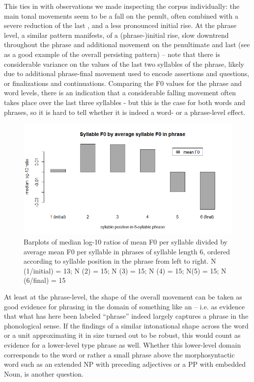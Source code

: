 \documentclass[output=paper]{LSP/langsci}
\begin{document}
This ties in with observations we made inspecting the corpus individually: the main tonal movements seem to be a fall on the penult, often combined with a severe reduction of the last , and a less pronounced initial rise. At the phrase level, a similar pattern manifests, of a (phrase-)initial rise, slow downtrend throughout the phrase and additional movement on the penultimate and last  (see   as a good example of the overall persisting pattern) – note that there is considerable variance on the values of the last two syllables of the phrase, likely due to additional phrase-final movement used to encode assertions and questions, or finalizations and continuations. Comparing the F0 values for the phrase and word levels, there is an indication that a considerable falling movement often takes place over the last three syllables - but this is the case for both words and phrases, so it is hard to tell whether it is indeed a word- or a phrase-level effect.

\begin{figure}
\includegraphics[width=\textwidth]{figures/BUC-img5_new.png}
\caption{Barplots of median log-10 ratios of mean F0 per syllable divided by average mean F0 per syllable in phrases of syllable length 6, ordered according to syllable position in the phrase from left to right. N (1/initial) = 13; N (2) = 15; N (3) = 15; N (4) = 15; N(5) = 15; N (6/final) = 15}
\label{fig:buc:5}
\end{figure}

At least at the phrase-level, the shape of the overall movement can be taken as good evidence for phrasing in the domain of something like an  – i.e. as evidence that what has here been labeled “phrase” indeed largely captures a phrase in the phonological sense. If the findings of a similar intonational shape across the word or a unit approximating it in size turned out to be robust, this would count as evidence for a lower-level type phrase as well. Whether this lower-level domain corresponds to the word or rather a small phrase above the morphosyntactic word such as an extended NP with preceding adjectives or a PP with embedded Noun, is another question.
\end{document}
